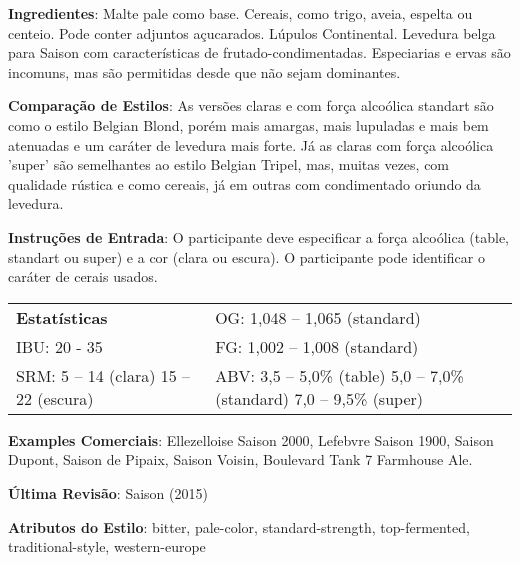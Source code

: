 \textbf{Ingredientes}: Malte pale como base. Cereais, como trigo, aveia, espelta ou centeio. Pode conter adjuntos açucarados. Lúpulos Continental. Levedura belga para Saison com características de frutado-condimentadas. Especiarias e ervas são incomuns, mas são permitidas desde que não sejam dominantes.

\textbf{Comparação de Estilos}: As versões claras e com força alcoólica standart são como o estilo Belgian Blond, porém mais amargas, mais lupuladas e mais bem atenuadas e um caráter de levedura mais forte. Já as claras com força alcoólica 'super' são semelhantes ao estilo Belgian Tripel, mas, muitas vezes, com qualidade rústica e como cereais, já em outras com condimentado oriundo da levedura.

\textbf{Instruções de Entrada}: O participante deve especificar a força alcoólica (table, standart ou super) e a cor (clara ou escura). O participante pode identificar o caráter de cerais usados.

\begin{tabular}{@{}p{35mm}p{35mm}@{}}
  \textbf{Estatísticas} & OG: 1,048 – 1,065 (standard)  \\
  IBU: 20 - 35  & FG: 1,002 – 1,008 (standard)   \\
  SRM: 5 – 14 (clara) 15 – 22 (escura) & ABV: 3,5 – 5,0\% (table) 5,0 – 7,0\% (standard) 7,0 – 9,5\% (super)
\end{tabular}

\textbf{Examples Comerciais}: Ellezelloise Saison 2000, Lefebvre Saison 1900, Saison Dupont, Saison de Pipaix, Saison Voisin, Boulevard Tank 7 Farmhouse Ale.

\textbf{Última Revisão}: Saison (2015)

\textbf{Atributos do Estilo}: bitter, pale-color, standard-strength, top-fermented, traditional-style, western-europe
